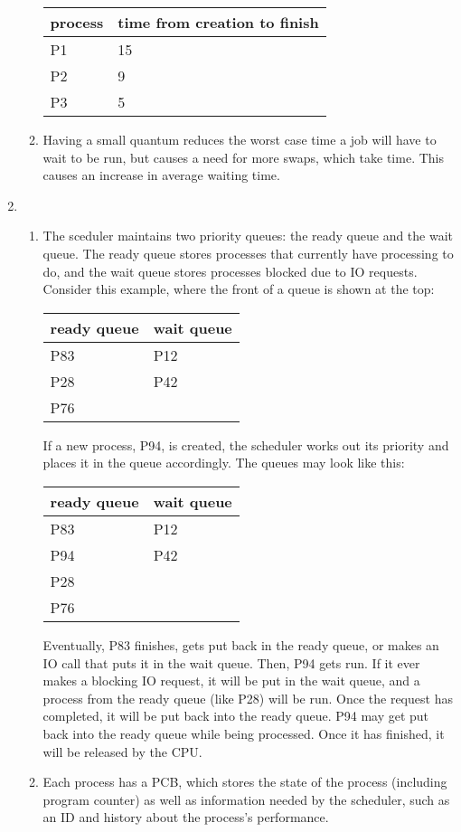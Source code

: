 \documentclass[11pt]{article}
\begin{document}
\begin{enumerate}
\begin{enumerate}
    \begin{tabular}{l|l}
      process & time from creation to finish \\
      \hline
      P1 & 15 \\
      P2 &  9 \\
      P3 &  5 \\
    \end{tabular}
  \item Having a small quantum reduces the worst case time a job will have to wait to be run, but causes a need for more swaps, which take time. This causes an increase in average waiting time.
  \end{enumerate}
\item
  \begin{enumerate}
  \item
    The sceduler maintains two priority queues: the ready queue and the wait queue. The ready queue stores processes that currently have processing to do, and the wait queue stores processes blocked due to IO requests. Consider this example, where the front of a queue is shown at the top:
    \begin{tabular}{l|l}
      ready queue & wait queue \\
      \hline
      P83 & P12 \\
      P28 & P42 \\
      P76 &     \\
    \end{tabular}
    If a new process, P94, is created, the scheduler works out its priority and places it in the queue accordingly. The queues may look like this:
    \begin{tabular}{l|l}
      ready queue & wait queue \\
      \hline
      P83 & P12 \\
      P94 & P42 \\
      P28 &     \\
      P76 &     \\
    \end{tabular}
    Eventually, P83 finishes, gets put back in the ready queue, or makes an IO call that puts it in the wait queue. Then, P94 gets run. If it ever makes a blocking IO request, it will be put in the wait queue, and a process from the ready queue (like P28) will be run. Once the request has completed, it will be put back into the ready queue. P94 may get put back into the ready queue while being processed. Once it has finished, it will be released by the CPU.
  \item Each process has a PCB, which stores the state of the process (including program counter) as well as information needed by the scheduler, such as an ID and history about the process's performance.

\end{enumerate}
\end{enumerate}
\end{document}
